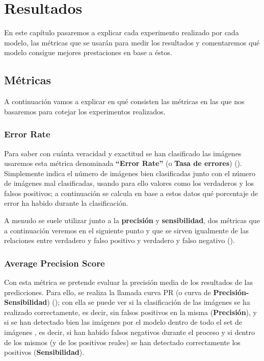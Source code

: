 \chapter{Resultados}
\label{ch:res}

En este capítulo pasaremos a explicar cada experimento realizado por cada modelo, las métricas que se usarán para medir los resultados y comentaremos qué modelo consigue mejores prestaciones en base a éstos.

\section{Métricas}

A continuación vamos a explicar en qué consisten las métricas en las que nos basaremos para cotejar los experimentos realizados.

\subsection{Error Rate}

Para saber con cuánta veracidad y exactitud se han clasificado las imágenes usaremos esta métrica denominada \textbf{``Error Rate''} (o \textbf{Tasa de errores}) (\cite{error-rate}). Simplemente indica el número de imágenes bien clasificadas junto con el número de imágenes mal clasificadas, usando para ello valores como los verdaderos y los falsos positivos; a continuación se calcula en base a estos datos qué porcentaje de error ha habido durante la clasificación.

A menudo se suele utilizar junto a la \textbf{precisión} y \textbf{sensibilidad}, dos métricas que a continuación veremos en el siguiente punto y que se sirven igualmente de las relaciones entre verdadero y falso positivo y verdadero y falso negativo (\cite{error-rate}).

\subsection{Average Precision Score}

Con esta métrica se pretende evaluar la precisión media de los resultados de las predicciones. Para ello, se realiza la llamada curva \ac{PR} (o curva de \textbf{Precisión-Sensibilidad}) (\cite{curvas-pr}); con ella se puede ver si la clasificación de las imágenes se ha realizado correctamente, es decir, sin falsos positivos en la misma (\textbf{Precisión}), y si se han detectado bien las imágenes por el modelo dentro de todo el set de imágenes , es decir, si han habido falsos negativos durante el proceso y si dentro de los mismos (y de los positivos reales) se han detectado correctamente los positivos (\textbf{Sensibilidad}). %

